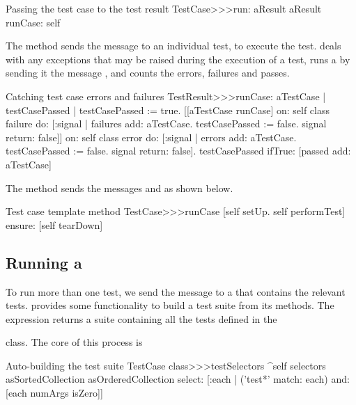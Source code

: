 \documentclass[a4paper,10pt,twoside]{book}
\begin{document}
{\begin{method}[testcaserun:]{Passing the test case to the test result}
TestCase>>>run: aResult
	aResult runCase: self
\end{method}
The method  sends
the message  to an individual test, to execute the test.
 deals with 
any exceptions that may be raised during the
execution of a test, runs a  by sending it the
message , and counts the errors, failures
and passes.
\begin{method}[testresultruncase]{Catching test case errors and failures}
TestResult>>>runCase: aTestCase
	| testCasePassed |
	testCasePassed := true.
	[[aTestCase runCase] 
			on: self class failure
			do: 
				[:signal | 
				failures add: aTestCase.
				testCasePassed := false.
				signal return: false]]
					on: self class error
					do:
						[:signal |
						errors add: aTestCase.
						testCasePassed := false.
						signal return: false].
	testCasePassed ifTrue: [passed add: aTestCase]
\end{method}

The method  sends the messages
 and  as shown below.
\begin{method}[testcaseruncase]{Test case template method}
TestCase>>>runCase
	[self setUp.
	self performTest] ensure: [self tearDown]
\end{method}

\subsection{Running a }

To run more than one test, we send the message
 to a  that contains the relevant tests. 
 provides some functionality to build a test suite from
its methods.  The expression  returns a suite containing all the tests defined in the { class.
The core of this process is
\begin{method}[testcasetestselectors]{Auto-building the test suite}
TestCase class>>>testSelectors 
	^self selectors asSortedCollection asOrderedCollection select: [:each | 
		('test*' match: each) and: [each numArgs isZero]]
\end{method}

}}
\end{document}
